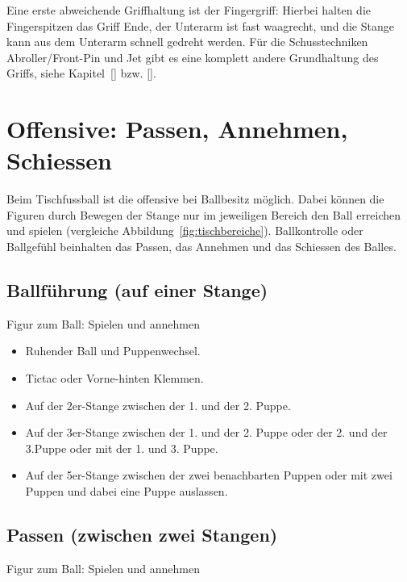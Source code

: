 Eine erste abweichende Griffhaltung ist der Fingergriff: Hierbei halten die Fingerspitzen das Griff Ende, der Unterarm ist fast waagrecht, und die Stange kann aus dem Unterarm schnell gedreht werden.
Für die Schusstechniken Abroller/Front-Pin und Jet gibt es eine komplett andere Grundhaltung des Griffs, siehe Kapitel~\ref{} bzw. \ref{}.


\section{Offensive: Passen, Annehmen, Schiessen}
\label{technik:offensive}

Beim Tischfussball ist die \gls{offensive} bei Ballbesitz möglich.
Dabei können die Figuren durch Bewegen der Stange nur im jeweiligen Bereich den Ball erreichen und spielen (vergleiche Abbildung~\ref{fig:tischbereiche}).
Ballkontrolle oder Ballgefühl beinhalten das Passen, das Annehmen und das Schiessen des Balles.



\subsection{Ballführung (auf einer Stange)} 
\label{technik:offensive:eine}

Figur zum Ball: Spielen und annehmen

\begin{itemize}
\item Ruhender Ball und Puppenwechsel.
\item Tictac oder Vorne-hinten Klemmen.
\item Auf der 2er-Stange zwischen der 1. und der 2. Puppe.
\item Auf der 3er-Stange zwischen der 1. und der 2. Puppe oder der 2. und der 3.Puppe oder mit der 1. und 3. Puppe.
\item Auf der 5er-Stange zwischen der zwei benachbarten Puppen oder mit zwei Puppen und dabei eine Puppe auslassen.
\end{itemize}


\subsection{Passen (zwischen zwei Stangen)}
\label{technik:offensive:zwei}

Figur zum Ball: Spielen und annehmen

